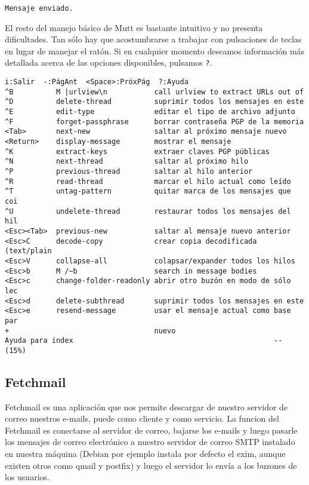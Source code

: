 \begin{verbatim}
Mensaje enviado.
\end{verbatim}

El resto  del manejo básico de  {\sf Mutt} es bastante  intuitivo y no
presenta dificultades. Tan  sólo hay que acostumbrarse  a trabajar con
pulsaciones de  teclas en lugar de  manejar el ratón. Si  en cualquier
momento  deseamos información  más  detallada acerca  de las  opciones
disponibles, pulsamos {\tt ?}.

\begin{verbatim}
i:Salir  -:PágAnt  <Space>:PróxPág  ?:Ayuda 
^B          M |urlview\n           call urlview to extract URLs out of 
^D          delete-thread          suprimir todos los mensajes en este 
^E          edit-type              editar el tipo de archivo adjunto
^F          forget-passphrase      borrar contraseña PGP de la memoria
<Tab>       next-new               saltar al próximo mensaje nuevo
<Return>    display-message        mostrar el mensaje
^K          extract-keys           extraer claves PGP públicas 
^N          next-thread            saltar al próximo hilo
^P          previous-thread        saltar al hilo anterior
^R          read-thread            marcar el hilo actual como leído
^T          untag-pattern          quitar marca de los mensajes que coi
^U          undelete-thread        restaurar todos los mensajes del hil
<Esc><Tab>  previous-new           saltar al mensaje nuevo anterior
<Esc>C      decode-copy            crear copia decodificada (text/plain
<Esc>V      collapse-all           colapsar/expander todos los hilos
<Esc>b      M /~b                  search in message bodies
<Esc>c      change-folder-readonly abrir otro buzón en modo de sólo lec
<Esc>d      delete-subthread       suprimir todos los mensajes en este 
<Esc>e      resend-message         usar el mensaje actual como base par
+                                  nuevo
Ayuda para index                                               -- (15%) 
\end{verbatim}

\subsection{Fetchmail}

{\sf Fetchmail} es una aplicación que nos permite descargar de nuestro
servidor  de  correo  nuestros  e-mails, puede  como  cliente  y  como
servicio. La funcion del {\sf  Fetchmail} es conectarse al servidor de
correo, bajarse  los e-mails  y luego pasarle  los mensajes  de correo
electrónico a  nuestro servidor  de correo  SMTP instalado  en nuestra
máquina (Debian por ejemplo instala  por defecto el {\sf exim}, aunque
existen otros como {\sf qmail} y {\sf postfix}) y luego el servidor lo
envía a los buzones de los usuarios.

